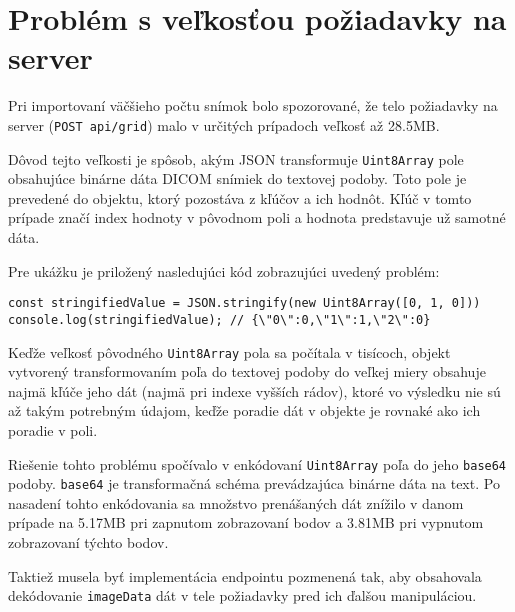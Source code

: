 \section {Problém s veľkosťou požiadavky na server}
Pri importovaní väčšieho počtu snímok bolo spozorované, že telo požiadavky na server (\texttt{POST api/grid}) malo v určitých prípadoch veľkosť až 28.5MB.

Dôvod tejto veľkosti je spôsob, akým JSON transformuje \texttt{Uint8Array} pole obsahujúce binárne dáta DICOM snímiek do textovej podoby. Toto pole je prevedené do objektu, ktorý pozostáva z kľúčov a ich hodnôt. Kľúč v tomto prípade značí index hodnoty v pôvodnom poli a hodnota predstavuje už samotné dáta.

\clearpage

Pre ukážku je priložený nasledujúci kód zobrazujúci uvedený problém:

\begin{minipage}[]{\linewidth}
\begin{verbatim}
const stringifiedValue = JSON.stringify(new Uint8Array([0, 1, 0]))
console.log(stringifiedValue); // {\"0\":0,\"1\":1,\"2\":0}
\end{verbatim}
\end{minipage}

Keďže veľkosť pôvodného \texttt{Uint8Array} pola sa počítala v tisícoch, objekt vytvorený transformovaním poľa do textovej podoby do veľkej miery obsahuje najmä kľúče jeho dát (najmä pri indexe vyšších rádov), ktoré vo výsledku nie sú až takým potrebným údajom, keďže poradie dát v objekte je rovnaké ako ich poradie v poli.

Riešenie tohto problému spočívalo v enkódovaní \texttt{Uint8Array} poľa do jeho \texttt{base64} podoby. \texttt{base64} je transformačná schéma prevádzajúca binárne dáta na text. Po nasadení tohto enkódovania sa množstvo prenášaných dát znížilo v danom prípade na 5.17MB pri zapnutom zobrazovaní  bodov a 3.81MB pri vypnutom zobrazovaní týchto bodov.

Taktiež musela byť implementácia endpointu pozmenená tak, aby obsahovala dekódovanie \texttt{imageData} dát v tele požiadavky pred ich ďalšou manipuláciou.